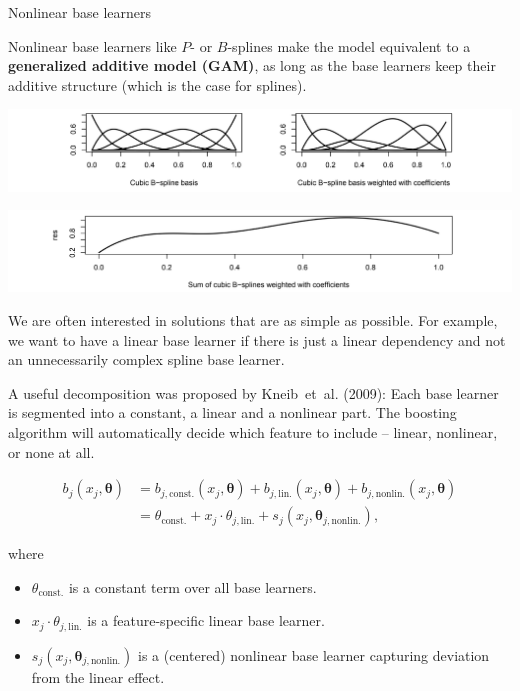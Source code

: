 \begin{vbframe}{Nonlinear base learners}

Nonlinear base learners like $P$- or $B$-splines make the model equivalent to a \textbf{generalized additive model (GAM)}, as long as the base learners keep their additive structure (which is the case for splines).
\vspace{0.5cm}

\begin{center}
\includegraphics[width=1\textwidth]{figure_man/NBL01.png}
\end{center}


\begin{center}
\includegraphics[width=1\textwidth]{figure_man/NBL02.png}
\end{center}

\framebreak

We are often interested in solutions that are as simple as possible. For example, we want to have a linear base learner if there is just a linear dependency and not an unnecessarily complex spline base learner.

\lz

A useful decomposition was proposed by Kneib~et~al. (2009): Each base learner is segmented into a constant, a linear and a nonlinear part. The boosting algorithm will automatically decide which feature to include -- linear, nonlinear, or none at all.

\vspace{-0.5cm}

\begin{align*}
b_j(x_j, \pmb\theta) & = b_{j,\text{const.}}(x_j, \pmb\theta) + b_{j,\text{lin.}}(x_j, \pmb\theta) + b_{j,\text{nonlin.}}(x_j, \pmb\theta)\\
 & = \theta_\text{const.} + x_j\cdot\theta_{j,\text{lin.}} + s_j(x_j, \pmb\theta_{j,\text{nonlin.}}),
\end{align*}

where
\begin{itemize}
  \item $\theta_\text{const.}$ is a constant term over all base learners.
  \item $x_j\cdot\theta_{j,\text{lin.}}$ is a feature-specific linear base learner.
  \item $s_j(x_j, \pmb\theta_{j,\text{nonlin.}})$ is a (centered) nonlinear base learner capturing deviation from the linear effect.
\end{itemize}

\end{vbframe}

